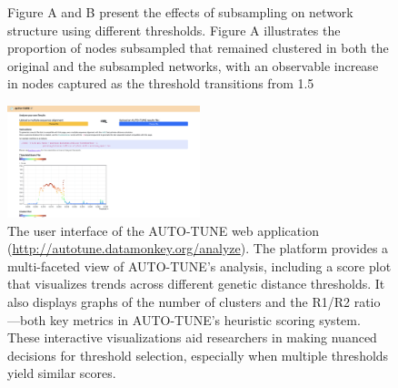 \documentclass[utf8]{FrontiersinHarvard} %
\begin{document}
\begin{figure}[h!]
	\caption{
		Figure A and B present the effects of subsampling on network structure using different thresholds. Figure A illustrates the proportion of nodes subsampled that remained clustered in both the original and the subsampled networks, with an observable increase in nodes captured as the threshold transitions from 1.5%
	}\label{fig:subsampling2}
\end{figure}

\begin{figure}[h!]
  \centering
  \includegraphics[width=0.5\textwidth]{./figures/webapp.png}
	\caption{ The user interface of the AUTO-TUNE web application
		(\url{http://autotune.datamonkey.org/analyze}). The platform provides a
		multi-faceted view of AUTO-TUNE's analysis, including a score plot that
		visualizes trends across different genetic distance thresholds. It also
		displays graphs of the number of clusters and the R1/R2 ratio—both key metrics
		in AUTO-TUNE's heuristic scoring system. These interactive visualizations aid
		researchers in making nuanced decisions for threshold selection, especially
		when multiple thresholds yield similar scores.
	}\label{fig:webapp}
\end{figure}
\end{document}
